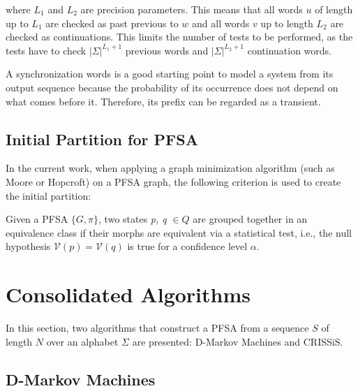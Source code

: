 {\noindent where $L_1$ and $L_2$ are precision parameters. This means that all words $u$ of length up to $L_1$ are checked as past previous to $w$ and all words $v$ up to length $L_2$ are checked as continuations. This limits the number of tests to be performed, as the tests have to check $|\Sigma|^{L_1 + 1}$ previous words and $|\Sigma|^{L_2+1}$ continuation words.


A synchronization words is a good starting point to model a system from its output sequence because the probability of its occurrence does not depend on what comes before it. Therefore, its prefix can be regarded as a transient.

\subsection{Initial Partition for PFSA}\label{subsec:inipart}

In the current work, when applying a graph minimization algorithm (such as Moore or Hopcroft) on a PFSA graph, the following criterion is used to create the initial partition:

\begin{definition}\label{def:inipartpfsa}

Given a PFSA $\{G,\pi\}$, two states \textit{p, q} $\in Q$ are grouped together in an equivalence class if their morphs are equivalent via a statistical test, i.e., the null hypothesis $\mathcal{V}(p) = \mathcal{V}(q)$ is true for a confidence level $\alpha$.

\end{definition}



\section{Consolidated Algorithms}

In this section, two algorithms that construct a PFSA from a sequence $S$ of length $N$ over an alphabet $\Sigma$ are presented: D-Markov Machines and CRISSiS.

\subsection{D-Markov Machines}

}

